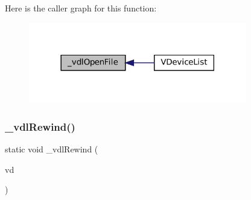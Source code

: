 Here is the caller graph for this function\+:
\nopagebreak
\begin{figure}[H]
\begin{center}
\leavevmode
\includegraphics[width=270pt]{vfs-devlist_8c_acb6e731f02f207723fe2d49f597c8e30_icgraph}
\end{center}
\end{figure}
\mbox{\label{vfs-devlist_8c_a0b42c631e426ff8d4ca9610a378e1668}} 
\subsubsection{\texorpdfstring{\+\_\+vdl\+Rewind()}{\_vdlRewind()}}
{\footnotesize\ttfamily static void \+\_\+vdl\+Rewind (\begin{DoxyParamCaption}\item[{struct V\+Dir $\ast$}]{vd }\end{DoxyParamCaption})\hspace{0.3cm}{\ttfamily [static]}}

